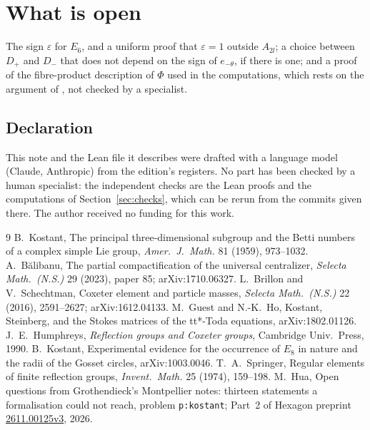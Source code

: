 \documentclass[11pt,a4paper]{amsart}
\theoremstyle{definition}
\theoremstyle{remark}
\begin{document}
\section{What is open}\label{sec:open}

The sign $\varepsilon$ for $E_6$, and a uniform proof that $\varepsilon = 1$ outside $A_{2l}$; a choice between $D_+$ and $D_-$ that does not depend on the sign of $e_{-\theta}$, if there is one; and a proof of the fibre-product description of $\Phi$ used in the computations, which rests on the argument of \cite{problems}, not checked by a specialist.

\subsection*{Declaration}
This note and the Lean file it describes were drafted with a language model (Claude, Anthropic) from the edition's registers. No part has been checked by a human specialist: the independent checks are the Lean proofs and the computations of Section~\ref{sec:checks}, which can be rerun from the commits given there. The author received no funding for this work.

\begin{thebibliography}{9}
 B.~Kostant, The principal three-dimensional subgroup and the Betti numbers of a complex simple Lie group, \emph{Amer.\ J.\ Math.} 81 (1959), 973--1032.
 A.~B\u{a}libanu, The partial compactification of the universal centralizer, \emph{Selecta Math.\ (N.S.)} 29 (2023), paper 85; arXiv:1710.06327.
 L.~Brillon and V.~Schechtman, Coxeter element and particle masses, \emph{Selecta Math.\ (N.S.)} 22 (2016), 2591--2627; arXiv:1612.04133.
 M.~Guest and N.-K.~Ho, Kostant, Steinberg, and the Stokes matrices of the tt*-Toda equations, arXiv:1802.01126.
 J.~E.~Humphreys, \emph{Reflection groups and Coxeter groups}, Cambridge Univ.\ Press, 1990.
 B.~Kostant, Experimental evidence for the occurrence of $E_8$ in nature and the radii of the Gosset circles, arXiv:1003.0046.
 T.~A.~Springer, Regular elements of finite reflection groups, \emph{Invent.\ Math.} 25 (1974), 159--198.
 M.~Hua, Open questions from Grothendieck's Montpellier notes: thirteen statements a formalisation could not reach, problem \texttt{p:kostant}; Part~2 of Hexagon preprint \href{https://hexagonmath.org/2611.00125v3}{2611.00125v3}, 2026.
\end{thebibliography}
\end{document}
